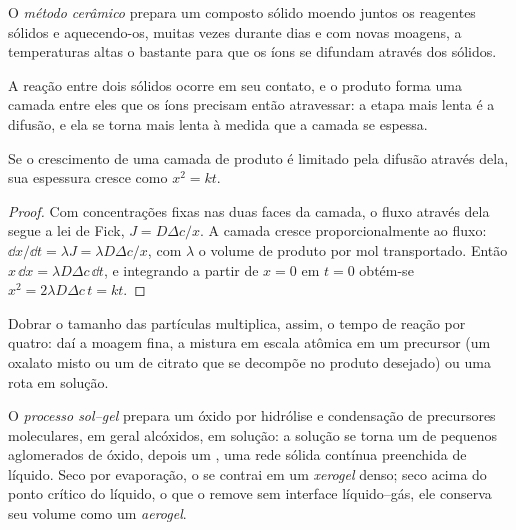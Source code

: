\begin{definition}\label{def:b3:inorganic-materials:ceramic-method}
O \emph{método cerâmico} prepara um composto sólido
moendo juntos os reagentes sólidos e aquecendo-os, muitas vezes durante dias e
com novas moagens, a temperaturas altas o bastante para que os íons se difundam através dos
sólidos.
\end{definition}

A reação entre dois sólidos ocorre em seu contato, e o produto forma uma
camada entre eles que os íons precisam então atravessar: a etapa mais lenta
é a difusão, e ela se torna mais lenta à medida que a camada se espessa.

\begin{proposition}\label{prop:b3:inorganic-materials:parabolic}
Se o crescimento de uma camada de produto é limitado pela difusão através dela, sua
espessura cresce como $x^2 = kt$.
\end{proposition}

\begin{proof}
Com concentrações fixas nas duas faces da camada, o fluxo através dela
segue a lei de Fick, $J = D\Delta c/x$. A camada cresce proporcionalmente ao fluxo:
$\dd x/\dd t = \lambda J = \lambda D\Delta c/x$, com $\lambda$ o volume de produto por mol transportado. Então
$x\,\dd x = \lambda D\Delta c\,\dd t$, e integrando a partir de $x = 0$ em $t = 0$ obtém-se $x^2 = 2\lambda D\Delta c\,t = kt$.
\end{proof}

Dobrar o tamanho das partículas multiplica, assim, o tempo de reação por quatro: daí
a moagem fina, a mistura em escala atômica em um precursor (um oxalato misto ou um
 de citrato que se decompõe no produto desejado) ou uma rota em solução.

\begin{definition}\label{def:b3:inorganic-materials:sol-gel}
O \emph{processo sol--gel} prepara um óxido por
hidrólise e condensação de precursores moleculares, em geral alcóxidos, em
solução: a solução se torna um  de pequenos aglomerados de óxido, depois um , uma
rede sólida contínua preenchida de líquido. Seco por evaporação, o 
se contrai em um \emph{xerogel} denso; seco acima do ponto
crítico do líquido, o que o remove sem interface líquido--gás, ele conserva
seu volume como um \emph{aerogel}.
\end{definition}

